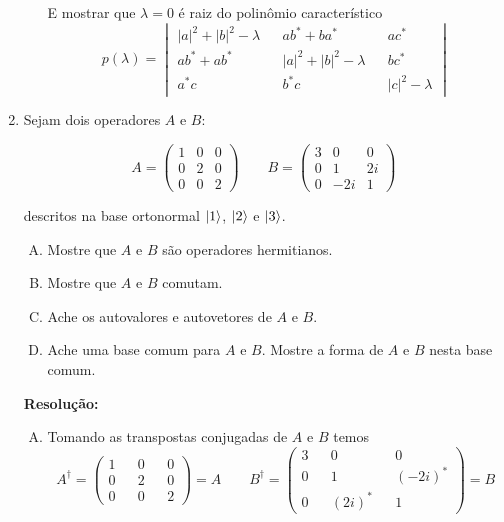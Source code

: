 \documentclass[a4paper, 12pt, notitlepage]{article}
\begin{document}
\begin{enumerate}
\begin{enumerate}[(A)]
   E mostrar que $\lambda = 0$ é raiz do polinômio característico
   \begin{equation*}
   p(\lambda) = \begin{vmatrix}
   |a|^2 + |b|^2 -\lambda&& ab^\ast + ba^\ast && ac^\ast \\
   ab^\ast + ab^\ast && |a|^2 + |b|^2 -\lambda && bc^\ast \\
   a^\ast c && b^\ast c && |c|^2 - \lambda
   \end{vmatrix}
   \end{equation*}

  
\end{enumerate}
\item Sejam dois operadores $A$ e $B$:

\begin{equation*}
  A = \begin{pmatrix} 1 & 0 & 0 \\ 0 & 2 & 0 \\ 0 & 0 & 2 \end{pmatrix} \qquad B = \begin{pmatrix} 3 & 0 & 0 \\ 0 & 1 & 2i \\ 0 & -2i & 1 \end{pmatrix}
\end{equation*}

descritos na base ortonormal $\ket{1}$, $\ket{2}$ e $\ket{3}$.

\begin{enumerate}[(A)]
  \item Mostre que $A$ e $B$ são operadores hermitianos.
  \item Mostre que $A$ e $B$ comutam.
  \item Ache os autovalores e autovetores de $A$ e $B$.
  \item Ache uma base comum para $A$ e $B$. Mostre a forma de $A$ e $B$ nesta base comum.
\end{enumerate}

\textbf{Resolução: }
\begin{enumerate}[(A)]
  \item
  Tomando as transpostas conjugadas de $A$ e $B$ temos
  \begin{equation*}
    A^\dagger =
    \begin{pmatrix}
      1 && 0 && 0 \\
      0 && 2 && 0 \\
      0 && 0 && 2
    \end{pmatrix} = A \qquad
    B^\dagger = 
    \begin{pmatrix}
      3 && 0 && 0 \\
      0 && 1 && (-2i)^\ast \\
      0 && (2i)^\ast && 1
    \end{pmatrix} = B
  \end{equation*}
  

\end{enumerate}
\end{enumerate}
\end{document}
